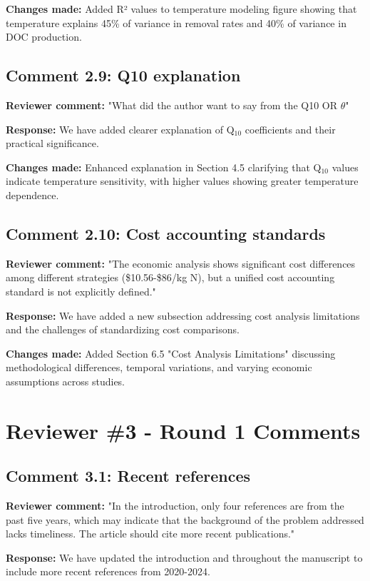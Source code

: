 \documentclass[12pt,a4paper]{article}
\begin{document}
\textbf{Changes made:} Added R² values to temperature modeling figure showing that temperature explains 45\% of variance in removal rates and 40\% of variance in DOC production.

\subsection{Comment 2.9: Q10 explanation}
\textbf{Reviewer comment:} "What did the author want to say from the Q10 OR $\theta$"

\textbf{Response:} We have added clearer explanation of Q$_{10}$ coefficients and their practical significance.

\textbf{Changes made:} Enhanced explanation in Section 4.5 clarifying that Q$_{10}$ values indicate temperature sensitivity, with higher values showing greater temperature dependence.

\subsection{Comment 2.10: Cost accounting standards}
\textbf{Reviewer comment:} "The economic analysis shows significant cost differences among different strategies (\$10.56-\$86/kg N), but a unified cost accounting standard is not explicitly defined."

\textbf{Response:} We have added a new subsection addressing cost analysis limitations and the challenges of standardizing cost comparisons.

\textbf{Changes made:} Added Section 6.5 "Cost Analysis Limitations" discussing methodological differences, temporal variations, and varying economic assumptions across studies.

\section{Reviewer \#3 - Round 1 Comments}

\subsection{Comment 3.1: Recent references}
\textbf{Reviewer comment:} "In the introduction, only four references are from the past five years, which may indicate that the background of the problem addressed lacks timeliness. The article should cite more recent publications."

\textbf{Response:} We have updated the introduction and throughout the manuscript to include more recent references from 2020-2024.
\end{document}

